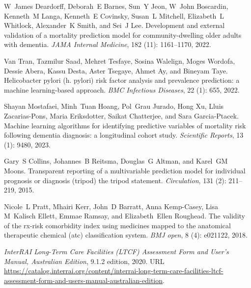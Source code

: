 \documentclass{article}
\begin{document}
\begin{thebibliography}{60}
W~James Deardorff, Deborah~E Barnes, Sun~Y Jeon, W~John Boscardin, Kenneth~M
  Langa, Kenneth~E Covinsky, Susan~L Mitchell, Elizabeth~L Whitlock,
  Alexander~K Smith, and Sei~J Lee.
\newblock Development and external validation of a mortality prediction model
  for community-dwelling older adults with dementia.
\newblock \emph{JAMA Internal Medicine}, 182 (11):
  1161--1170, 2022.

Van Tran, Tazmilur Saad, Mehret Tesfaye, Sosina Walelign, Moges Wordofa, Dessie
  Abera, Kassu Desta, Aster Tsegaye, Ahmet Ay, and Bineyam Taye.
\newblock Helicobacter pylori (h. pylori) risk factor analysis and prevalence
  prediction: a machine learning-based approach.
\newblock \emph{BMC Infectious Diseases}, 22 (1): 655, 2022.

Shayan Mostafaei, Minh~Tuan Hoang, Pol~Grau Jurado, Hong Xu, Lluis
  Zacarias-Pons, Maria Eriksdotter, Saikat Chatterjee, and Sara Garcia-Ptacek.
\newblock Machine learning algorithms for identifying predictive variables of
  mortality risk following dementia diagnosis: a longitudinal cohort study.
\newblock \emph{Scientific Reports}, 13 (1): 9480, 2023.

Gary~S Collins, Johannes~B Reitsma, Douglas~G Altman, and Karel~GM Moons.
\newblock Transparent reporting of a multivariable prediction model for
  individual prognosis or diagnosis (tripod) the tripod statement.
\newblock \emph{Circulation}, 131 (2): 211--219, 2015.

Nicole~L Pratt, Mhairi Kerr, John~D Barratt, Anna Kemp-Casey, Lisa M~Kalisch
  Ellett, Emmae Ramsay, and Elizabeth~Ellen Roughead.
\newblock The validity of the rx-risk comorbidity index using medicines mapped
  to the anatomical therapeutic chemical (atc) classification system.
\newblock \emph{BMJ open}, 8 (4): e021122, 2018.

\emph{InterRAI Long-Term Care Facilities (LTCF) Assessment Form and User's
  Manual, Australian Edition}, 9.1.2 edition, 2020.
\newblock URL
  \url{https://catalog.interrai.org/content/interrai-long-term-care-facilities-ltcf-assessment-form-and-users-manual-australian-edition}.


\end{thebibliography}
\end{document}
